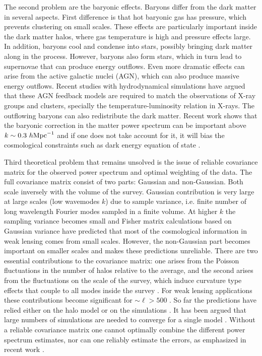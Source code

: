 \documentclass[
  11pt,
  twoside,
  openright,
  titlepage,
  headings=optiontoheadandtoc
]{scrbook}
\begin{document}
The second problem are the baryonic effects. Baryons differ from the dark matter in several aspects. 
First difference is that hot baryonic gas has pressure, which prevents clustering on small scales. These effects are particularly important 
inside the dark matter halos, where gas temperature is high and pressure effects large. In addition, 
baryons cool and condense into stars, possibly bringing dark matter along in the process. However, baryons also
form stars, which in turn lead to supernovae that can produce energy outflows. Even more dramatic effects
can arise from the active galactic nuclei (AGN), which can also produce massive energy outflows.
Recent studies with hydrodynamical simulations \citep{2011MNRAS.415.3649V} have argued that 
these AGN feedback models are required to match the observations of X-ray groups and clusters, specially the 
temperature-luminosity relation in X-rays. The outflowing baryons can also redistribute the dark matter. 
Recent work \citep{2011MNRAS.417.2020S,2013MNRAS.434..148S}
shows that the baryonic correction in the matter power spectrum can be
important above $k \sim 0.3 \ h \rm{Mpc}^{-1}$ and if one does not take account for it, 
it will bias the cosmological constraints such as dark energy equation of state \citep{2011MNRAS.417.2020S}. 

Third theoretical problem that remains unsolved
is the issue of reliable covariance matrix for the observed power spectrum and optimal weighting of the data. 
The full covariance matrix consist of two parts: Gaussian and non-Gaussian. Both scale inversely with the volume of the 
survey. Gaussian contribution is very large at large scales (low wavemodes $k$)
due to sample variance, i.e. finite number of long wavelength 
Fourier modes sampled in a finite volume. At higher $k$ the sampling variance becomes small and Fisher matrix calculations based 
on Gaussian variance have predicted that most of the cosmological information in weak lensing comes from small scales. 
However, the non-Gaussian part becomes important on smaller scales and makes these predictions unreliable. 
There are two essential contributions to the covariance matrix: 
one arises from the Poisson fluctuations in the number of halos relative to the average, and the 
second arises from the fluctuations on the scale of the survey, which induce curvature type effects
that couple to all modes inside the survey \citep{2011JCAP...10..031B,2013PhRvD..87l3504T}. For weak lensing applications these contributions become
significant for $\sim \ell > 500$ \citep{2012PhRvD..86h3504Y}. 
So far the predictions have relied either on the halo model \citep{2013PhRvD..87l3504T} 
or on the simulations \citep{2009ApJ...701..945S,2011ApJ...734...76S,2014PhRvD..89h3519L}. It has 
been argued that large numbers of simulations are needed to converge for a single model \citep{2011ApJ...734...76S,2014arXiv1406.2713B}. 
Without a reliable covariance matrix one cannot optimally combine the different power spectrum estimates, 
nor can one reliably estimate the errors, as emphasized in recent work 
\citep{2014MNRAS.442.2728T,2014MNRAS.439.2531P}. 
\end{document}
